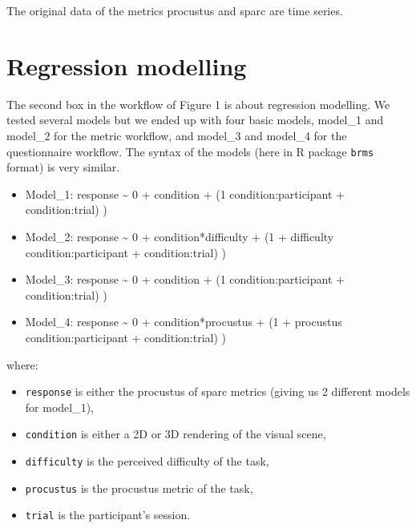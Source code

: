 \documentclass[
]{article}
\begin{document}
The original data of the metrics procustus and sparc are time series.

\hypertarget{regression-modelling}{%
\section{Regression modelling}\label{regression-modelling}}

The second box in the workflow of Figure 1 is about regression
modelling. We tested several models but we ended up with four basic
models, model\_1 and model\_2 for the metric workflow, and model\_3 and
model\_4 for the questionnaire workflow. The syntax of the models (here
in R package \texttt{brms} format) is very similar.

\begin{itemize}
\item
  Model\_1: response \textasciitilde{} 0 + condition + (1 \textbar{}
  condition:participant + condition:trial) )
\item
  Model\_2: response \textasciitilde{} 0 + condition*difficulty + (1 +
  difficulty \textbar{} condition:participant + condition:trial) )
\item
  Model\_3: response \textasciitilde{} 0 + condition + (1 \textbar{}
  condition:participant + condition:trial) )
\item
  Model\_4: response \textasciitilde{} 0 + condition*procustus + (1 +
  procustus \textbar{} condition:participant + condition:trial) )
\end{itemize}

where:

\begin{itemize}
\item
  \texttt{response} is either the procustus of sparc metrics (giving us
  2 different models for model\_1),
\item
  \texttt{condition} is either a 2D or 3D rendering of the visual scene,
\item
  \texttt{difficulty} is the perceived difficulty of the task,
\item
  \texttt{procustus} is the procustus metric of the task,
\item
  \texttt{trial} is the participant's session.
\end{itemize}
\end{document}
